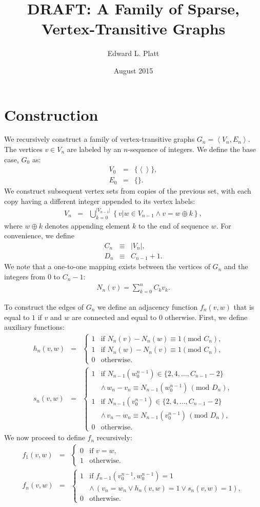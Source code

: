 \documentclass{article}
\title{DRAFT: A Family of Sparse, Vertex-Transitive Graphs}
\author{Edward L. Platt}
\date{August 2015}
\newcommand{\la}{\left\langle}
\newcommand{\ra}{\right\rangle}
\newcommand{\beq}{\begin{eqnarray}}
\newcommand{\eeq}{\end{eqnarray}}
\newcommand{\append}{\oplus}
\begin{document}
\maketitle

\section{Construction}

We recursively construct a family of vertex-transitive graphs
$G_n = \la V_n, E_n \ra$.
The vertices $v \in V_n$ are labeled by an $n$-sequence of integers.
We define the base case, $G_0$ as:
\beq
V_0 &=& \{\la \ra\}, \\
E_0 &=& \{\}.
\eeq
We construct subsequent vertex sets from copies of the previous set,
with each copy having a different integer appended to its vertex labels:
\beq
V_n &=& \bigcup_{k = 0}^{|V_{n-1}|}
\left\{ v | w \in V_{n-1} \land v = w \append k \right\},
\eeq
where $w \append k$ denotes appending element $k$ to the end of sequence $w$.
For convenience, we define
\beq
C_n &\equiv& |V_n|, \\
D_n &\equiv& C_{n-1} + 1.
\eeq
We note that a one-to-one mapping exists between the vertices of $G_n$ and the
integers from $0$ to $C_n - 1$:
\beq
N_n(v) = \sum_{k=0}^n C_k v_k.
\eeq

To construct the edges of $G_n$ we define an adjacency function $f_n(v,w)$
that is equal to $1$ if $v$ and $w$ are connected and equal to $0$ otherwise.
First, we define auxiliary functions:
\beq
h_n(v,w)
&=&
\begin{cases}
1 & \mbox{if } N_n(v) - N_n(w) \equiv 1 (\mbox{mod } C_n), \\
1 & \mbox{if } N_n(w) - N_n(v) \equiv 1 (\mbox{mod } C_n), \\
0 & \mbox{otherwise}.
\end{cases} \\
s_n(v,w)
&=&
\begin{cases}
1 & \mbox{if }
N_{n-1}(w_0^{n-1}) \in \{ 2, 4, \ldots, C_{n-1} - 2\} \\
&
\land \, w_n - v_n \equiv N_{n-1}(w_0^{n-1}) \, (\mbox{mod } D_n), \\
1 & \mbox{if }
N_{n-1}(v_0^{n-1}) \in \{ 2, 4, \ldots, C_{n-1} - 2\} \\
&
\land \, v_n - w_n \equiv N_{n-1}(v_0^{n-1}) \, (\mbox{mod } D_n), \\
0 & \mbox{otherwise}.
\end{cases}
\eeq
We now proceed to define $f_n$ recursively:
\beq
f_1(v,w)
&=&
\begin{cases}
0 & \mbox{if } v = w, \\
1 & \mbox{otherwise}.
\end{cases} \\
f_n(v,w)
&=&
\begin{cases}
1 & \mbox{if } f_{n-1}(v_0^{n-1}, w_0^{n-1}) = 1 \\
&
\land \, (v_n = w_n
\lor
h_n(v, w) = 1
\lor
s_n(v, w) = 1
),\\
0 & \mbox{otherwise}.
\end{cases}
\eeq



\end{document}
